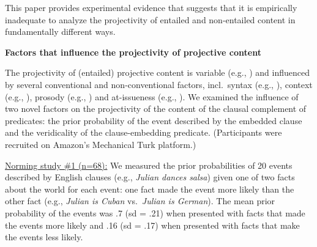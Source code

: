 \documentclass[12pt,fleqn]{article}
\newcommand{\6}{\mbox{$[\hspace*{-.6mm}[$}}
\newcommand{\9}{\mbox{$]\hspace*{-.6mm}]$}}
\begin{document}
This paper provides experimental evidence that suggests that it is empirically inadequate to analyze the projectivity of entailed and non-entailed content in fundamentally different ways. 

{\bf Factors that influence the projectivity of projective content}

The projectivity of (entailed) projective content is variable (e.g., \citealt{karttunen71b,kadmon01,tbd-variability}) and influenced by several conventional and non-conventional factors, incl.\ syntax (e.g., \citealt{potts05}), context (e.g., \citealt{beaver-belly}), prosody (e.g., \citealt{cummins-rohde2015,tonhauser-salt26}) and at-issueness (e.g., \citealt{tbd-variability}). We examined the influence of two novel factors on the projectivity of the content of the clausal complement of predicates: the prior probability of the event described by the embedded clause and the veridicality of the clause-embedding predicate. (Participants were recruited on Amazon's Mechanical Turk platform.)

\vspace*{.7ex}

\underline{Norming study \#1 (n=68):} We measured the prior probabilities of 20 events described by English clauses (e.g., {\em Julian dances salsa}) given one of two facts about the world for each event: one fact made the event more likely than the other fact (e.g., {\em Julian is Cuban} vs.\ {\em Julian is German}). The mean prior probability of the events was .7 (sd = .21) when presented with facts that made the events more likely and .16 (sd = .17) when presented with facts that make the events less likely.

\vspace*{.7ex}
\end{document}
